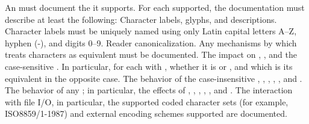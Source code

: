 \endsubSection%



   An  must document the   
   it supports. For each   supported,
   the documentation must describe at least the following:
\beginlist
\itemitem{\bull}
   Character labels, glyphs, and descriptions.
   Character labels must be uniquely named using only Latin capital letters A--Z,
   hyphen (-), and digits 0--9.
\itemitem{\bull}
   Reader canonicalization.
   Any mechanisms by which  treats
    characters as equivalent must be documented.
\itemitem{\bull}
   The impact on ,
		 ,
	     and the case-sensitive .
   In particular, for each  with ,
   whether it is  or ,
   and which  is its equivalent in the opposite case.
\itemitem{\bull}
   The behavior of the case-insensitive 
     , ,
     , , 
     , and .
\itemitem{\bull}
   The behavior of any  ;
   in particular, the effects of
   ,
   ,
   ,
   ,
   , 
   and
   .
\itemitem{\bull}
   The interaction with file I/O, in particular,
   the supported coded character sets (for example, ISO8859/1-1987)
   and external encoding schemes supported are documented.
\endlist
{} 

\endsubsection%

